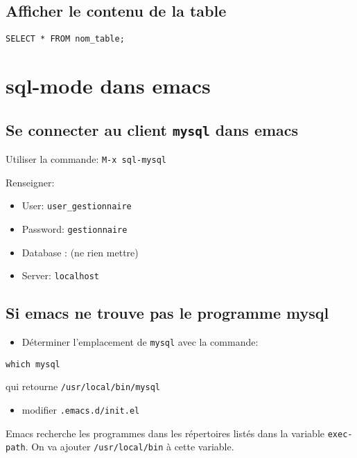 \documentclass[11pt]{article}
\begin{document}
\subsection{Afficher le contenu de la table}
\label{sec:org260fc08}
\begin{verbatim}
SELECT * FROM nom_table;
\end{verbatim}


\section{sql-mode dans emacs}
\label{sec:org3cd1ce2}

\subsection{Se connecter au client \texttt{mysql} dans emacs}
\label{sec:org2d2db5a}

Utiliser la commande: \texttt{M-x sql-mysql}

Renseigner:
\begin{itemize}
\item User: \texttt{user\_gestionnaire}
\item Password: \texttt{gestionnaire}
\item Database : (ne rien mettre)
\item Server: \texttt{localhost}
\end{itemize}

\subsection{Si emacs ne trouve pas le programme mysql}
\label{sec:orga1a13ec}
\begin{itemize}
\item Déterminer l'emplacement de \texttt{mysql} avec la commande:
\end{itemize}
\begin{verbatim}
which mysql
\end{verbatim}
qui retourne \texttt{/usr/local/bin/mysql}

\begin{itemize}
\item modifier \texttt{.emacs.d/init.el}
\end{itemize}

Emacs recherche les programmes dans les répertoires listés dans la variable \texttt{exec-path}. On va ajouter  \texttt{/usr/local/bin} à cette variable.
\end{document}
